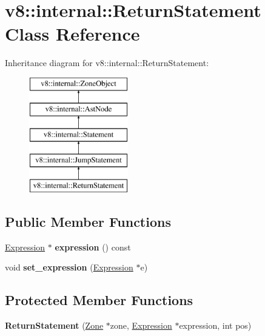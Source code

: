 \hypertarget{classv8_1_1internal_1_1_return_statement}{}\section{v8\+:\+:internal\+:\+:Return\+Statement Class Reference}
\label{classv8_1_1internal_1_1_return_statement}
Inheritance diagram for v8\+:\+:internal\+:\+:Return\+Statement\+:\begin{figure}[H]
\begin{center}
\leavevmode
\includegraphics[height=5.000000cm]{classv8_1_1internal_1_1_return_statement}
\end{center}
\end{figure}
\subsection*{Public Member Functions}
\begin{DoxyCompactItemize}
\item 
\hyperlink{classv8_1_1internal_1_1_expression}{Expression} $\ast$ {\bfseries expression} () const \hypertarget{classv8_1_1internal_1_1_return_statement_a60412ff90af1806fa3d0753a3a873254}{}\label{classv8_1_1internal_1_1_return_statement_a60412ff90af1806fa3d0753a3a873254}

\item 
void {\bfseries set\+\_\+expression} (\hyperlink{classv8_1_1internal_1_1_expression}{Expression} $\ast$e)\hypertarget{classv8_1_1internal_1_1_return_statement_a51e5aae604a084b317ebe70c202b7213}{}\label{classv8_1_1internal_1_1_return_statement_a51e5aae604a084b317ebe70c202b7213}

\end{DoxyCompactItemize}
\subsection*{Protected Member Functions}
\begin{DoxyCompactItemize}
\item 
{\bfseries Return\+Statement} (\hyperlink{classv8_1_1internal_1_1_zone}{Zone} $\ast$zone, \hyperlink{classv8_1_1internal_1_1_expression}{Expression} $\ast$expression, int pos)\hypertarget{classv8_1_1internal_1_1_return_statement_adb2518d0af45983789770f3caced2608}{}\label{classv8_1_1internal_1_1_return_statement_adb2518d0af45983789770f3caced2608}

\end{DoxyCompactItemize}
